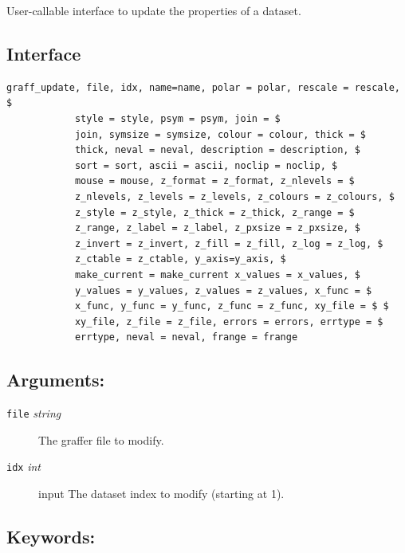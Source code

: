 \documentclass[11pt,twoside,english]{article}
\begin{document}
User-callable interface to update the properties of a dataset.

\subsection{Interface}
\label{sec:upd_interface}


\begin{verbatim}
graff_update, file, idx, name=name, polar = polar, rescale = rescale, $
            style = style, psym = psym, join = $
            join, symsize = symsize, colour = colour, thick = $
            thick, neval = neval, description = description, $
            sort = sort, ascii = ascii, noclip = noclip, $
            mouse = mouse, z_format = z_format, z_nlevels = $
            z_nlevels, z_levels = z_levels, z_colours = z_colours, $
            z_style = z_style, z_thick = z_thick, z_range = $
            z_range, z_label = z_label, z_pxsize = z_pxsize, $
            z_invert = z_invert, z_fill = z_fill, z_log = z_log, $
            z_ctable = z_ctable, y_axis=y_axis, $
            make_current = make_current x_values = x_values, $
            y_values = y_values, z_values = z_values, x_func = $
            x_func, y_func = y_func, z_func = z_func, xy_file = $ $
            xy_file, z_file = z_file, errors = errors, errtype = $
            errtype, neval = neval, frange = frange
\end{verbatim}

\subsection{Arguments:}
\label{sec:gu_args}


\begin{description}
\item[\texttt{file} \textit{string}] The graffer file to modify.
\item[\texttt{idx} \textit{int}] input The dataset index to modify
  (starting at 1).
\end{description}

\subsection{Keywords:}
\label{sec:gu-keywords}
\end{document}
